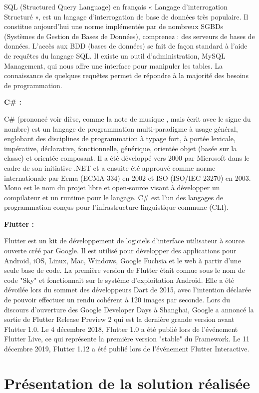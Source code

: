 SQL (Structured Query Language) en français « Langage d’interrogation Structuré », est un langage d’interrogation de base de données très populaire. Il constitue aujourd’hui une norme implémentée par de nombreux SGBDs (Systèmes de Gestion de Bases de Données), comprenez : des serveurs de bases de données. L’accès aux BDD (bases de données) se fait de façon standard à l’aide de requêtes du langage SQL. Il existe un outil d’administration, MySQL Management, qui nous offre une interface pour manipuler les tables. La connaissance de quelques requêtes permet de répondre à la majorité des besoins de programmation.

\textbf{C\#   :} 

C\# (prononcé voir dièse, comme la note de musique , mais écrit avec le signe du nombre) est un langage de programmation multi-paradigme à usage général, englobant des disciplines de programmation à typage fort, à portée lexicale, impérative, déclarative, fonctionnelle, générique, orientée objet (basée sur la classe) et orientée composant. Il a été développé vers 2000 par Microsoft dans le cadre de son initiative .NET et a ensuite été approuvé comme norme internationale par Ecma (ECMA-334) en 2002 et ISO (ISO/IEC 23270) en 2003. Mono est le nom du projet libre et open-source visant à développer un compilateur et un runtime pour le langage. C\# est l'un des langages de programmation conçus pour l'infrastructure linguistique commune (CLI).

\textbf{Flutter   :} 

Flutter est un kit de développement de logiciels d'interface utilisateur à source ouverte créé par Google. Il est utilisé pour développer des applications pour Android, iOS, Linux, Mac, Windows, Google Fuchsia et le web à partir d'une seule base de code. La première version de Flutter était connue sous le nom de code "Sky" et fonctionnait sur le système d'exploitation Android. Elle a été dévoilée lors du sommet des développeurs Dart de 2015, avec l'intention déclarée de pouvoir effectuer un rendu cohérent à 120 images par seconde. Lors du discours d'ouverture des Google Developer Days à Shanghai, Google a annoncé la sortie de Flutter Release Preview 2 qui est la dernière grande version avant Flutter 1.0. Le 4 décembre 2018, Flutter 1.0 a été publié lors de l'événement Flutter Live, ce qui représente la première version "stable" du Framework. Le 11 décembre 2019, Flutter 1.12 a été publié lors de l'événement Flutter Interactive.

\section{Présentation de la solution réalisée}

